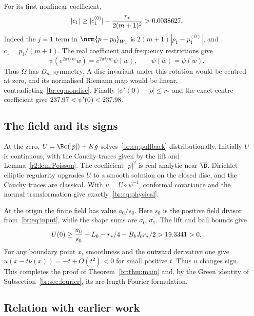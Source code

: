 For its first nonlinear coefficient,
\begin{equation}\label{br:eq:nondisc}
 |c_1|\ge|c_1^{(0)}|-\frac{r_*}{2(m+1)^2}>0.0038627.
\end{equation}
Indeed the $j=1$ term in $\nrm{p-p_0}_{W_1}$ is
$2(m+1)|p_1-p_1^{(0)}|$, and $c_1=p_1/(m+1)$.
The real coefficient and frequency restrictions give
\[
 \psi(e^{2\pi i/m}w)=e^{2\pi i/m}\psi(w),\qquad
 \psi(\bar w)=\overline{\psi(w)}.
\]
Thus $\Omega$ has $D_m$ symmetry. A disc invariant under this rotation
would be centred at zero, and its normalised Riemann map would be
linear, contradicting~\eqref{br:eq:nondisc}. Finally
$|\psi'(0)-\rho|\le r_*$ and the exact centre coefficient give
$237.97<\psi'(0)<237.98$.

\subsection{The field and its signs}\label{br:sec:sign}
At the zero, $U=\Bc(|p|)+Kg$ solves~\eqref{br:eq:pullback}
distributionally. Initially $U$ is continuous, with the Cauchy traces
given by the lift and Lemma~\ref{r2:lem:Poisson}. The coefficient
$|p|^2$ is real analytic near $\overline\D$. Dirichlet elliptic
regularity upgrades $U$ to a smooth solution on the closed disc,
and the Cauchy traces are classical. With
$u=U\circ\psi^{-1}$, conformal covariance and the normal transformation
give exactly~\eqref{br:eq:physical}.

At the origin the finite field has value $a_0/s_0$. Here $s_0$ is
the positive field divisor from~\eqref{br:eq:input}, while the shape
sums are $\sigma_0,\sigma_1$. The lift and ball bounds give
\begin{equation}\label{br:eq:origin}
 U(0)\ge\frac{a_0}{s_0}-L_0-r_*/4-B_bJ_br_*/2>19.3341>0.
\end{equation}
For any boundary point $x$, smoothness and the outward derivative one
give $u(x-t\nu(x))=-t+O(t^2)<0$ for small positive $t$.
Thus $u$ changes sign. This completes the proof of
Theorem~\ref{br:thm:main} and, by the Green identity of
Subsection~\ref{br:sec:fourier}, its arc-length Fourier formulation.

\subsection{Relation with earlier work}\label{br:sec:literature}
